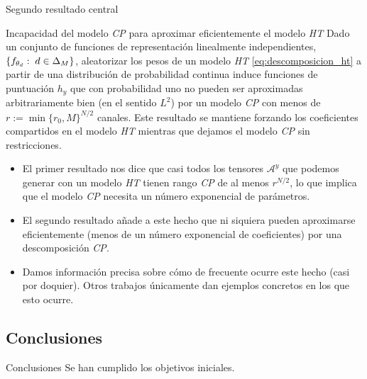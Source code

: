 \begin{frame}{Segundo resultado central}

	\begin{block}{Incapacidad del modelo \textit{CP} para aproximar eficientemente el modelo \textit{HT}}
		Dado un conjunto de funciones de representación linealmente independientes, $\{ f_{\theta_d}: \; d \in \Delta_{M} \}$, aleatorizar los pesos de un modelo \textit{HT} \eqref{eq:descomposicion_ht} a partir de una distribución de probabilidad continua induce funciones de puntuación $h_y$ que con probabilidad uno no pueden ser aproximadas arbitrariamente bien (en el sentido $L^2$) por un modelo \textit{CP} con menos de $r := \min \{r_0, M \}^{N/2}$ canales. Este resultado se mantiene forzando los coeficientes compartidos en el modelo \textit{HT} mientras que dejamos el modelo \textit{CP} sin restricciones.
	\end{block}

\end{frame}

\begin{frame}
	\begin{itemize}
		\item El primer resultado nos dice que casi todos los tensores $\mathcal{A}^y$ que podemos generar con un modelo \textit{HT} tienen rango \textit{CP} de al menos $r^{N/2}$, lo que implica que el modelo \textit{CP} necesita un número exponencial de parámetros.
		\item El segundo resultado añade a este hecho que ni siquiera pueden aproximarse eficientemente (menos de un número exponencial de coeficientes) por una descomposición \textit{CP}.
		\item Damos información precisa sobre cómo de frecuente ocurre este hecho (casi por doquier). Otros trabajos \cite{matematicas:descomposicion_ht} únicamente dan ejemplos concretos en los que esto ocurre.
	\end{itemize}
\end{frame}

\subsection{Conclusiones}
\begin{frame}{Conclusiones}
	Se han cumplido los objetivos iniciales.
\end{frame}
